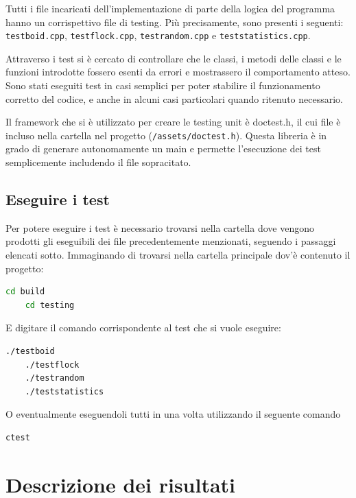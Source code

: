 \documentclass[10pt,a4paper]{article}
\begin{document}
Tutti i file incaricati dell'implementazione di parte della logica del programma hanno un corrispettivo file di testing. Più precisamente, sono presenti i seguenti: \texttt{testboid.cpp}, \texttt{testflock.cpp}, \texttt{testrandom.cpp} e \texttt{teststatistics.cpp}. 

Attraverso i test si è cercato di controllare che le classi, i metodi delle classi e le funzioni introdotte fossero esenti da errori e mostrassero il comportamento atteso. Sono stati eseguiti test in casi semplici per poter stabilire il funzionamento corretto del codice, e anche in alcuni casi particolari quando ritenuto necessario.

Il framework che si è utilizzato per creare le testing unit è doctest.h, il cui file è incluso nella cartella nel progetto (\texttt{/assets/doctest.h}). Questa libreria è in grado di generare autonomamente un main e permette l'esecuzione dei test semplicemente includendo il file sopracitato.

\subsection{Eseguire i test}

Per potere eseguire i test è necessario trovarsi nella cartella dove vengono prodotti gli eseguibili dei file precedentemente menzionati, seguendo i passaggi elencati sotto. Immaginando di trovarsi nella cartella principale dov'è contenuto il progetto:

\begin{lstlisting}[language=bash]
    cd build
    cd testing
\end{lstlisting}

E digitare il comando corrispondente al test che si vuole eseguire: 

\begin{lstlisting}[language=bash]
    ./testboid
    ./testflock
    ./testrandom
    ./teststatistics
\end{lstlisting}

O eventualmente eseguendoli tutti in una volta utilizzando il seguente comando

\begin{lstlisting}[language=bash]
    ctest
\end{lstlisting}


\section{Descrizione dei risultati}
\end{document}
